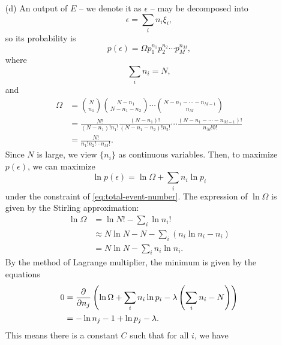 \documentclass[hyperref, a4paper]{article}
\begin{document}
\begin{itemize}
\item[(d)] An output of $E$ -- we denote it as $\epsilon$ -- may be decomposed into
\begin{equation}
    \epsilon = \sum_i n_i \xi_i,
\end{equation}
so its probability is 
\begin{equation}
    p(\epsilon) = \Omega p_1^{n_1} p_2^{n_2} \cdots p_M^{n_M},
\end{equation}
where 
\begin{equation}
    \sum_{i} n_i = N,
    \label{eq:total-event-number}
\end{equation}
and 
\begin{equation}
    \begin{aligned}
        \Omega &= \binom{N}{n_1} \binom{N - n_1}{N - n_1 - n_2} \cdots \binom{N - n_1 - \cdots - n_{M-1}}{n_M} \\
        &= \frac{N!}{(N-n_1)! n_1!} \frac{(N - n_1)!}{(N - n_1 - n_2)! n_2!} 
        \cdots \frac{(N - n_1 - \cdots - n_{M-1})!}{n_{M}! 0!} \\
        &= \frac{N!}{n_1! n_2! \cdots n_M!}.
    \end{aligned}
\end{equation}
Since $N$ is large, we view $\{n_i\}$ as continuous variables.
Then, to maximize $p(\epsilon)$, we can maximize
\begin{equation}
    \ln p(\epsilon) = \ln \Omega + \sum_{i} n_i \ln p_i
\end{equation}
under the constraint of \eqref{eq:total-event-number}.
The expression of $\ln \Omega$ is given by the Stirling approximation:
\begin{equation}
    \begin{aligned}
        \ln \Omega &= \ln N! - \sum_i \ln n_i! \\
        &\approx N \ln N - N - \sum_i (n_i \ln n_i - n_i) \\
        &= N \ln N - \sum_i n_i \ln n_i.
    \end{aligned}
\end{equation}
By the method of Lagrange multiplier, the minimum is given by the equations 
\[
    \begin{aligned}
        0 &= \pdv{n_j} \left( \ln \Omega + \sum_i n_i \ln p_i - \lambda \left( \sum_i n_i - N \right)  \right) \\
        &= - \ln n_j - 1 + \ln p_j - \lambda.
    \end{aligned}
\] 
This means there is a constant $C$ such that for all $i$, we have 
\[
\]
\end{itemize}
\end{document}
